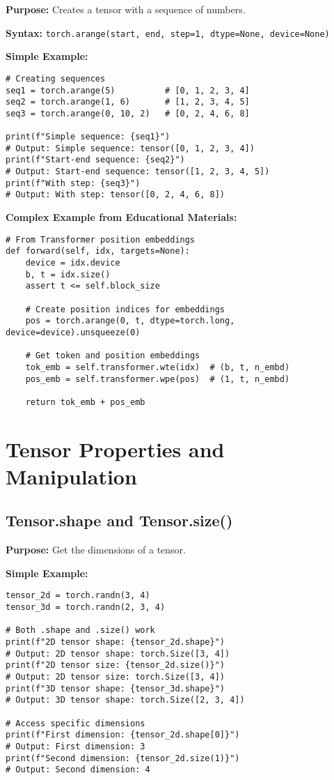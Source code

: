 \documentclass[11pt,a4paper]{book}
\begin{document}
\textbf{Purpose:} Creates a tensor with a sequence of numbers.

\textbf{Syntax:} \texttt{torch.arange(start, end, step=1, dtype=None, device=None)}

\textbf{Simple Example:}
\begin{verbatim}
# Creating sequences
seq1 = torch.arange(5)          # [0, 1, 2, 3, 4]
seq2 = torch.arange(1, 6)       # [1, 2, 3, 4, 5]
seq3 = torch.arange(0, 10, 2)   # [0, 2, 4, 6, 8]

print(f"Simple sequence: {seq1}")
# Output: Simple sequence: tensor([0, 1, 2, 3, 4])
print(f"Start-end sequence: {seq2}")
# Output: Start-end sequence: tensor([1, 2, 3, 4, 5])
print(f"With step: {seq3}")
# Output: With step: tensor([0, 2, 4, 6, 8])
\end{verbatim}

\textbf{Complex Example from Educational Materials:}
\begin{verbatim}
# From Transformer position embeddings
def forward(self, idx, targets=None):
    device = idx.device
    b, t = idx.size()
    assert t <= self.block_size
    
    # Create position indices for embeddings
    pos = torch.arange(0, t, dtype=torch.long, device=device).unsqueeze(0)
    
    # Get token and position embeddings
    tok_emb = self.transformer.wte(idx)  # (b, t, n_embd)
    pos_emb = self.transformer.wpe(pos)  # (1, t, n_embd)
    
    return tok_emb + pos_emb
\end{verbatim}

\section{Tensor Properties and Manipulation}

\subsection{Tensor.shape and Tensor.size()}

\textbf{Purpose:} Get the dimensions of a tensor.

\textbf{Simple Example:}
\begin{verbatim}
tensor_2d = torch.randn(3, 4)
tensor_3d = torch.randn(2, 3, 4)

# Both .shape and .size() work
print(f"2D tensor shape: {tensor_2d.shape}")
# Output: 2D tensor shape: torch.Size([3, 4])
print(f"2D tensor size: {tensor_2d.size()}")
# Output: 2D tensor size: torch.Size([3, 4])
print(f"3D tensor shape: {tensor_3d.shape}")
# Output: 3D tensor shape: torch.Size([2, 3, 4])

# Access specific dimensions
print(f"First dimension: {tensor_2d.shape[0]}")
# Output: First dimension: 3
print(f"Second dimension: {tensor_2d.size(1)}")
# Output: Second dimension: 4
\end{verbatim}
\end{document}
